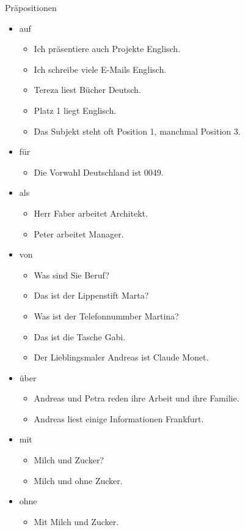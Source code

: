 \begin{syntax}{Präpositionen}{}

\begin{itemize}
	\item auf \begin{itemize}
		\item Ich präsentiere auch Projekte  Englisch.
		\item Ich schreibe viele E-Mails  Englisch.
		\item Tereza liest Bücher  Deutsch.
		\item {} Platz 1 liegt Englisch.
		\item Das Subjekt steht oft  Position 1, manchmal  Position 3.
	\end{itemize}
	\item für \begin{itemize}
		\item Die Vorwahl  Deutschland ist 0049.
	\end{itemize}
	\item als \begin{itemize}
		\item Herr Faber arbeitet  Architekt.
		\item Peter arbeitet  Manager.
	\end{itemize}
	\item von \begin{itemize}
		\item Was sind Sie  Beruf?
		\item Das ist der Lippenstift  Marta?
		\item Was ist der Telefonnummber  Martina?
		\item Das ist die Tasche  Gabi.
		\item Der Lieblingsmaler  Andreas ist Claude Monet.
	\end{itemize}
	\item über \begin{itemize}
		\item Andreas und Petra reden  ihre Arbeit und ihre Familie.
		\item Andreas liest einige Informationen  Frankfurt.
	\end{itemize}
	\item mit \begin{itemize}
		\item {} Milch und Zucker?
		\item {} Milch und ohne Zucker.
	\end{itemize}
	\item ohne \begin{itemize}
		\item Mit Milch und  Zucker.
	\end{itemize}
\end{itemize}
\end{syntax}
